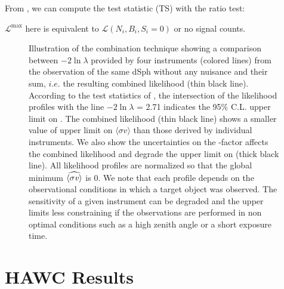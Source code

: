 From , we can compute the test statistic (TS) with the ratio test:

\gdTS

$\mathcal{L}^{\textrm{max}}$ here is equivalent to $\mathcal{L}(N_i, B_i,S_i=0)$ or no signal counts.

\begin{figure}
\caption{Illustration of the combination technique showing a comparison between $-2\ln  \lambda$ provided by four instruments (colored lines) from the observation of the same dSph without any \J nuisance and their sum, $i.e.$ the resulting combined likelihood (thin black line). According to the test statistics of , the intersection of the likelihood profiles with the line $-2\ln  \lambda$ = 2.71 indicates the 95\% C.L. upper limit on \sv. The combined likelihood (thin black line) shows a smaller value of upper limit on $\langle \sigma v \rangle$ than those derived by individual instruments. We also show the uncertainties on the \J-factor affects the combined likelihood and degrade the upper limit on \sv (thick black line). All likelihood profiles are normalized so that the global minimum $\widehat{\langle \sigma \mathit{v} \rangle}$ is 0. We note that each profile depends on the observational conditions in which a target object was observed. The sensitivity of a given instrument can be degraded and the upper limits less constraining if the observations are performed in non optimal conditions such as a high zenith angle or a short exposure time.}
\label{fig:illustration_combination}
\end{figure}

\section{HAWC Results}\label{sec:hawc_results}

